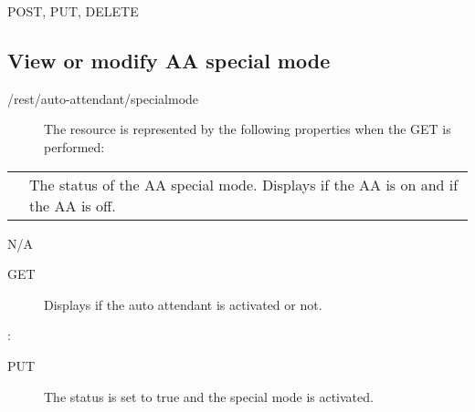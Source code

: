 \documentclass[letterpaper,10pt,english]{sphinxmanual}
\begin{document}
 POST, PUT, DELETE


\subsection{View or modify AA special mode}
\label{\detokenize{restapi:view-or-modify-aa-special-mode}}
 /rest/auto-attendant/specialmode
\begin{description}
\item[{}] \leavevmode
The resource is represented by the following properties when the GET is performed:

\end{description}


\begin{savenotes}\sphinxattablestart
\centering
\begin{tabulary}{\linewidth}[t]{|T|T|}
\hline

&
\\
\hline
{}
&
The status of the AA special mode. Displays  if the AA is on and  if the AA is off.
\\
\hline
\end{tabulary}
\par
\sphinxattableend\end{savenotes}

 N/A
\begin{description}
\item[{ GET}] \leavevmode
Displays if the auto attendant is activated or not.

\end{description}

:

\begin{sphinxVerbatim}[commandchars=\\\{\}]
\end{sphinxVerbatim}
\begin{description}
\item[{ PUT}] \leavevmode
The status is set to true and the special mode is activated.

\end{description}
\end{document}
